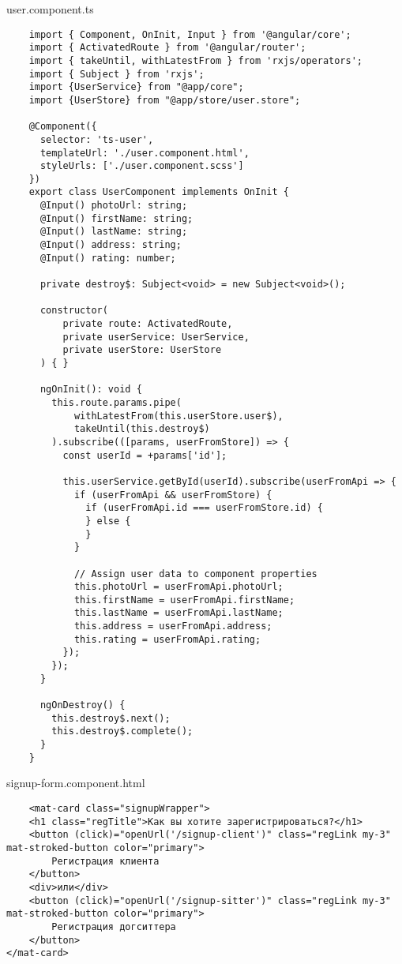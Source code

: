 user.component.ts
\lstset{style=ts}
\begin{lstlisting}
    import { Component, OnInit, Input } from '@angular/core';
    import { ActivatedRoute } from '@angular/router';
    import { takeUntil, withLatestFrom } from 'rxjs/operators';
    import { Subject } from 'rxjs';
    import {UserService} from "@app/core";
    import {UserStore} from "@app/store/user.store";
    
    @Component({
      selector: 'ts-user',
      templateUrl: './user.component.html',
      styleUrls: ['./user.component.scss']
    })
    export class UserComponent implements OnInit {
      @Input() photoUrl: string;
      @Input() firstName: string;
      @Input() lastName: string;
      @Input() address: string;
      @Input() rating: number;
    
      private destroy$: Subject<void> = new Subject<void>();
    
      constructor(
          private route: ActivatedRoute,
          private userService: UserService,
          private userStore: UserStore
      ) { }
    
      ngOnInit(): void {
        this.route.params.pipe(
            withLatestFrom(this.userStore.user$),
            takeUntil(this.destroy$)
        ).subscribe(([params, userFromStore]) => {
          const userId = +params['id'];
    
          this.userService.getById(userId).subscribe(userFromApi => {
            if (userFromApi && userFromStore) {
              if (userFromApi.id === userFromStore.id) {
              } else {
              }
            }
    
            // Assign user data to component properties
            this.photoUrl = userFromApi.photoUrl;
            this.firstName = userFromApi.firstName;
            this.lastName = userFromApi.lastName;
            this.address = userFromApi.address;
            this.rating = userFromApi.rating;
          });
        });
      }
    
      ngOnDestroy() {
        this.destroy$.next();
        this.destroy$.complete();
      }
    }    
\end{lstlisting}

signup-form.component.html
\begin{lstlisting}
    <mat-card class="signupWrapper">
    <h1 class="regTitle">Как вы хотите зарегистрироваться?</h1>
    <button (click)="openUrl('/signup-client')" class="regLink my-3" mat-stroked-button color="primary">
        Регистрация клиента
    </button>
    <div>или</div>
    <button (click)="openUrl('/signup-sitter')" class="regLink my-3" mat-stroked-button color="primary">
        Регистрация догситтера
    </button>
</mat-card>
\end{lstlisting}

